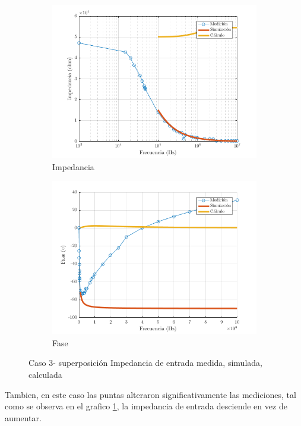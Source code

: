 \documentclass[../../main.tex]{subfiles}
\begin{document}
\begin{figure}[H]
\centering
\begin{subfigure}[http]{0.49\textwidth}
\includegraphics[width=\textwidth]{imagenes/z_inv_r_c3.png}
\caption{Impedancia}\label{fig=zInvZc3}
\end{subfigure}
\begin{subfigure}[http]{0.49\textwidth}
\includegraphics[width=\textwidth]{imagenes/z_inv_f_c3.png}
\caption{Fase} \label{fig=zInvFc3}
\end{subfigure}
\caption{Caso 3- superposición Impedancia de entrada  medida, simulada, calculada}
\end{figure}

Tambien, en este caso las puntas alteraron significativamente las mediciones, tal como se observa en el grafico \ref{fig=zInvZc3}, la impedancia de entrada desciende en vez de aumentar.
\end{document}
